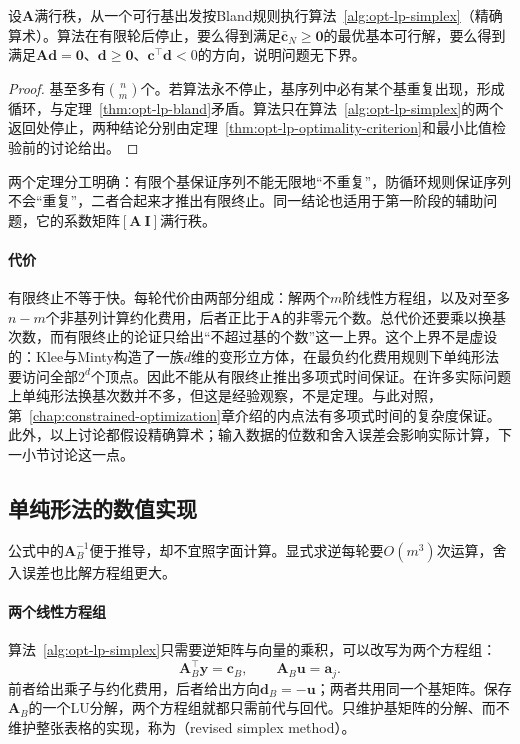 \begin{theorem}[单纯形法的有限终止]
\label{thm:opt-lp-finite}
设$\bm A$满行秩，从一个可行基出发按Bland规则执行算法~\ref{alg:opt-lp-simplex}（精确算术）。算法在有限轮后停止，要么得到满足$\bar{\bm c}_N\ge\bm 0$的最优基本可行解，要么得到满足$\bm A\bm d=\bm 0$、$\bm d\ge\bm 0$、$\bm c^\top\bm d<0$的方向，说明问题无下界。
\end{theorem}

\begin{proof}
基至多有$\binom nm$个。若算法永不停止，基序列中必有某个基重复出现，形成循环，与定理~\ref{thm:opt-lp-bland}矛盾。算法只在算法~\ref{alg:opt-lp-simplex}的两个返回处停止，两种结论分别由定理~\ref{thm:opt-lp-optimality-criterion}和最小比值检验前的讨论给出。
\end{proof}

两个定理分工明确：有限个基保证序列不能无限地“不重复”，防循环规则保证序列不会“重复”，二者合起来才推出有限终止。同一结论也适用于第一阶段的辅助问题，它的系数矩阵$[\bm A\ \bm I]$满行秩。

\paragraph{代价}
有限终止不等于快。每轮代价由两部分组成：解两个$m$阶线性方程组，以及对至多$n-m$个非基列计算约化费用，后者正比于$\bm A$的非零元个数。总代价还要乘以换基次数，而有限终止的论证只给出“不超过基的个数”这一上界。这个上界不是虚设的：Klee与Minty构造了一族$d$维的变形立方体，在最负约化费用规则下单纯形法要访问全部$2^d$个顶点。因此不能从有限终止推出多项式时间保证。在许多实际问题上单纯形法换基次数并不多，但这是经验观察，不是定理。与此对照，第~\ref{chap:constrained-optimization}章介绍的内点法有多项式时间的复杂度保证。此外，以上讨论都假设精确算术；输入数据的位数和舍入误差会影响实际计算，下一小节讨论这一点。

\subsection{单纯形法的数值实现}
\label{sec:opt-lp-revised-simplex}

公式中的$\bm A_B^{-1}$便于推导，却不宜照字面计算。显式求逆每轮要$O(m^3)$次运算，舍入误差也比解方程组更大。

\paragraph{两个线性方程组}
算法~\ref{alg:opt-lp-simplex}只需要逆矩阵与向量的乘积，可以改写为两个方程组：
\[
  \bm A_B^\top\bm y=\bm c_B,\qquad
  \bm A_B\bm u=\bm a_j.
\]
前者给出乘子与约化费用，后者给出方向$\bm d_B=-\bm u$；两者共用同一个基矩阵。保存$\bm A_B$的一个LU分解，两个方程组就都只需前代与回代。只维护基矩阵的分解、而不维护整张表格的实现，称为（revised simplex method）。

